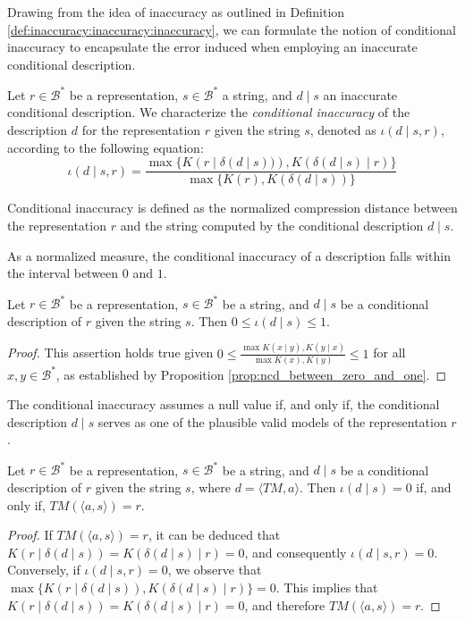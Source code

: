 Drawing from the idea of inaccuracy as outlined in Definition \ref{def:inaccuracy:inaccuracy:inaccuracy}, we can formulate the notion of conditional inaccuracy to encapsulate the error induced when employing an inaccurate conditional description.

\begin{definition}
Let $r \in \mathcal{B}^\ast$ be a representation, $s \in \mathcal{B}^\ast$ a string, and $d \mid s$ an inaccurate conditional description. We characterize the \emph{conditional inaccuracy} of the description $d$ for the representation $r$ given the string $s$, denoted as $\iota(d \mid s, r)$, according to the following equation:
\[
\iota(d \mid s, r) = \frac{ \max\{ K \left(r \mid \delta(d \mid s) ) \right), K \left( \delta(d \mid s) \mid r \right) \} } { \max\{ K(r), K \left( \delta(d \mid s) \right) \} }
\]
\end{definition}

Conditional inaccuracy is defined as the normalized compression distance between the representation $r$ and the string computed by the conditional description $d \mid s$.

As a normalized measure, the conditional inaccuracy of a description falls within the interval between $0$ and $1$.

\begin{proposition}
\label{prop:range_conditional_inaccuracy}
Let $r \in \mathcal{B}^\ast$ be a representation, $s \in \mathcal{B}^\ast$ be a string, and $d \mid s$ be a conditional description of $r$ given the string $s$. Then $0 \leq \iota(d \mid s) \leq 1$.
\end{proposition}
\begin{proof}
This assertion holds true given $0 \leq \frac{ \max{ K(x \mid y), K(y \mid x) } } { \max{ K(x), K(y) } } \leq 1$ for all $x, y \in \mathcal{B}^\ast$, as established by Proposition \ref{prop:ncd_between_zero_and_one}.
\end{proof}

The conditional inaccuracy assumes a null value if, and only if, the conditional description $d \mid s$ serves as one of the plausible valid models of the representation $r$.

\begin{proposition}\label{prop:perfect_description}
Let $r \in \mathcal{B}^\ast$ be a representation, $s \in \mathcal{B}^\ast$ be a string, and $d \mid s$ be a conditional description of $r$ given the string $s$, where $d = \langle TM, a \rangle$. Then $\iota(d \mid s) = 0$ if, and only if, $TM \left(\langle a, s \rangle \right) = r$.
\end{proposition}
\begin{proof}
If $TM \left(\langle a, s \rangle \right) = r$, it can be deduced that $K \left( r \mid \delta(d \mid s) \right) = K \left( \delta(d \mid s) \mid r \right) = 0$, and consequently $\iota(d \mid s, r) = 0$. Conversely, if $\iota(d \mid s, r) = 0$, we observe that $\max\{ K \left( r \mid \delta(d \mid s) \right), K \left( \delta(d \mid s) \mid r \right) \} = 0$. This implies that $K \left( r \mid \delta(d \mid s) \right) = K \left( \delta(d \mid s) \mid r \right) = 0$, and therefore $TM \left(\langle a, s \rangle \right) = r$.
\end{proof}

